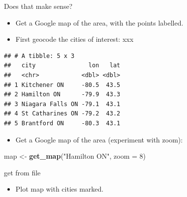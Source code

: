 \documentclass[ignorenonframetext,]{beamer}
\newenvironment{Shaded}{\begin{snugshade}}{\end{snugshade}}
\newcommand{\DataTypeTok}[1]{\textcolor[rgb]{0.13,0.29,0.53}{#1}}
\newcommand{\DecValTok}[1]{\textcolor[rgb]{0.00,0.00,0.81}{#1}}
\newcommand{\KeywordTok}[1]{\textcolor[rgb]{0.13,0.29,0.53}{\textbf{#1}}}
\newcommand{\NormalTok}[1]{#1}
\newcommand{\OperatorTok}[1]{\textcolor[rgb]{0.81,0.36,0.00}{\textbf{#1}}}
\newcommand{\StringTok}[1]{\textcolor[rgb]{0.31,0.60,0.02}{#1}}
\providecommand{\tightlist}{%
  \setlength{\itemsep}{0pt}\setlength{\parskip}{0pt}}
\begin{document}
\begin{frame}[fragile]{Does that make sense?}
\protect\hypertarget{does-that-make-sense}{}

\begin{itemize}
\item
  Get a Google map of the area, with the points labelled.
\item
  First geocode the cities of interest: xxx
\end{itemize}

\footnotesize

\begin{Shaded}
\end{Shaded}

\begin{verbatim}
## # A tibble: 5 x 3
##   city               lon   lat
##   <chr>            <dbl> <dbl>
## 1 Kitchener ON     -80.5  43.5
## 2 Hamilton ON      -79.9  43.3
## 3 Niagara Falls ON -79.1  43.1
## 4 St Catharines ON -79.2  43.2
## 5 Brantford ON     -80.3  43.1
\end{verbatim}

\normalsize

\begin{itemize}
\tightlist
\item
  Get a Google map of the area (experiment with zoom):
\end{itemize}

\begin{Shaded}
\begin{Highlighting}[]
\NormalTok{map <-}\StringTok{ }\KeywordTok{get_map}\NormalTok{(}\StringTok{"Hamilton ON"}\NormalTok{, }\DataTypeTok{zoom =} \DecValTok{8}\NormalTok{)}
\end{Highlighting}
\end{Shaded}

get from file

\begin{itemize}
\tightlist
\item
  Plot map with cities marked.
\end{itemize}

\end{frame}
\end{document}
